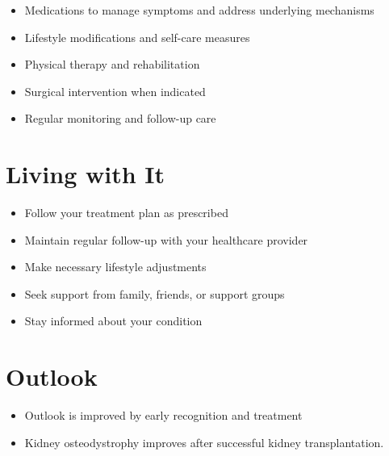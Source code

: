 \begin{itemize}[noitemsep]
  \item Medications to manage symptoms and address underlying mechanisms
  \item Lifestyle modifications and self-care measures
  \item Physical therapy and rehabilitation
  \item Surgical intervention when indicated
  \item Regular monitoring and follow-up care
\end{itemize}
\section{Living with It}
\begin{itemize}[noitemsep]
  \item Follow your treatment plan as prescribed
  \item Maintain regular follow-up with your healthcare provider
  \item Make necessary lifestyle adjustments
  \item Seek support from family, friends, or support groups
  \item Stay informed about your condition
\end{itemize}
\section{Outlook}
\begin{itemize}[noitemsep]
  \item Outlook is improved by early recognition and treatment
  \item Kidney osteodystrophy improves after successful kidney transplantation.
\end{itemize}
